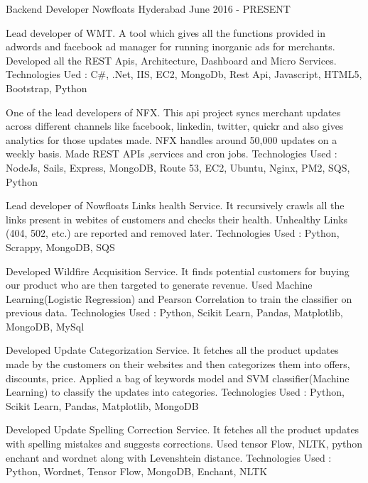 

\begin{cventries}

  \cventry
    {Backend Developer} %
    {Nowfloats} %
    {Hyderabad} %
    {June 2016 - PRESENT} %
    {
      \begin{cvitems} %
        \item {Lead developer of WMT. A tool which gives all the functions provided in adwords and facebook ad manager for running inorganic ads for merchants. Developed all the REST Apis, Architecture, Dashboard and Micro Services. Technologies Ued : C\#, .Net, IIS, EC2, MongoDb, Rest Api, Javascript, HTML5, Bootstrap, Python}
        \item {One of the lead developers of NFX. This api project syncs merchant updates across different channels like facebook, linkedin, twitter, quickr and also gives analytics for those updates made. NFX handles around 50,000 updates on a weekly basis. Made REST APIs ,services and cron jobs. Technologies Used : NodeJs, Sails, Express, MongoDB, Route 53, EC2, Ubuntu, Nginx, PM2, SQS, Python}
        \item {Lead developer of Nowfloats Links health Service. It recursively crawls all the links present in webites of customers and checks their health. Unhealthy Links (404, 502, etc.) are reported and removed later. Technologies Used : Python, Scrappy, MongoDB, SQS  }
        \item {Developed Wildfire Acquisition Service. It finds potential customers for buying our product who are then targeted to generate revenue. Used Machine Learning(Logistic Regression) and Pearson Correlation to train the classifier on previous data. Technologies Used : Python, Scikit Learn, Pandas, Matplotlib, MongoDB, MySql  }
        \item {Developed Update Categorization Service. It fetches all the product updates made by the customers on their websites and then categorizes them into offers, discounts, price. Applied a bag of keywords model and SVM classifier(Machine Learning) to classify the updates into categories. Technologies Used : Python, Scikit Learn, Pandas, Matplotlib, MongoDB  }
        \item {Developed Update Spelling Correction Service. It fetches all the product updates with spelling mistakes and suggests corrections. Used tensor Flow, NLTK, python enchant and wordnet along with Levenshtein distance. Technologies Used : Python, Wordnet, Tensor Flow, MongoDB, Enchant, NLTK  }
      \end{cvitems}
    }


\end{cventries}
